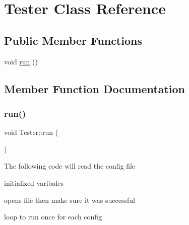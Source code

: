 \hypertarget{class_tester}{}\section{Tester Class Reference}
\label{class_tester}
\subsection*{Public Member Functions}
\begin{DoxyCompactItemize}
\item 
void \mbox{\hyperlink{class_tester_a9dddc60b4882130e392944262cca160b}{run}} ()
\end{DoxyCompactItemize}


\subsection{Member Function Documentation}
\mbox{\label{class_tester_a9dddc60b4882130e392944262cca160b}} 
\subsubsection{\texorpdfstring{run()}{run()}}
{\footnotesize\ttfamily void Tester\+::run (\begin{DoxyParamCaption}{ }\end{DoxyParamCaption})}

The following code will read the config file

initialized varibales

opens file then make sure it was successful

loop to run once for each config

